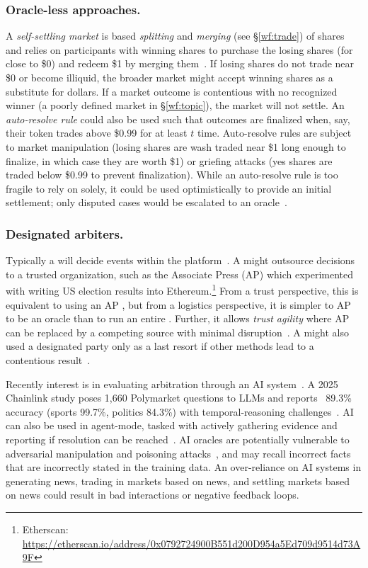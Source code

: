 \subsubsection{Oracle-less approaches.}

A \textit{self-settling market} is based \textit{splitting} and \textit{merging} (see \S\ref{wf:trade}) of shares and relies on participants with winning shares to purchase the losing shares (for close to \$0) and redeem \$1 by merging them~\cite{BMR17}. If losing shares do not trade near \$0 or become illiquid, the broader market might accept winning shares as a substitute for dollars. If a market outcome is contentious with no recognized winner (\eg a poorly defined market in \S\ref{wf:topic}), the market will not settle. An \textit{auto-resolve rule} could also be used such that outcomes are finalized when, say, their token trades above \$0.99 for at least $t$ time. Auto-resolve rules are subject to market manipulation (losing shares are wash traded near \$1 long enough to finalize, in which case they are worth \$1) or griefing attacks (yes shares are traded below \$0.99 to prevent finalization). While an auto-resolve rule is too fragile to rely on solely, it could be used optimistically to provide an initial settlement; only disputed cases would be escalated to an oracle~\cite{Aug15}. 

\subsubsection{Designated arbiters.}

Typically a \cepm will decide events within the platform~\cite{kalshi}. A \depm might outsource decisions to a trusted organization, such as the Associate Press (AP) which experimented with writing US election results into Ethereum.\footnote{Etherscan: \url{https://etherscan.io/address/0x0792724900B551d200D954a5Ed709d9514d73A9F}} From a trust perspective, this is equivalent to using an AP \cepm, but from a logistics perspective, it is simpler to AP to be an oracle than to run an entire \cepm. Further, it allows \textit{trust agility} where AP can be replaced by a competing source with minimal disruption~\cite{BCFKMN14}. A \depm might also used a designated party only as a last resort if other methods lead to a contentious result~\cite{Rey24}. 

Recently interest is in evaluating arbitration through an AI system~\cite{chaos}. A 2025 Chainlink study poses 1,660 Polymarket questions to LLMs and reports ~89.3\% accuracy (sports 99.7\%, politics 84.3\%)  with temporal-reasoning challenges~\cite{ZVW25}. AI can also be used in agent-mode, tasked with actively gathering evidence and reporting if resolution can be reached~\cite{chaos}. AI oracles are potentially vulnerable to adversarial manipulation and poisoning attacks~\cite{ZGWJ25}, and may recall incorrect facts that are incorrectly stated in the training data. An over-reliance on AI systems in generating news, trading in markets based on news, and settling markets based on news could result in bad interactions or negative feedback loops. 

